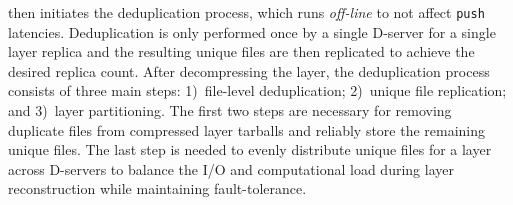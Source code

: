 %
%
%
%
\sysname then initiates the deduplication process, which runs \emph{off-line} to not affect \texttt{push}
latencies. Deduplication is only performed once by a single D-server for a single layer replica
and the resulting unique files are then replicated to achieve the desired replica count.
After decompressing the layer, the deduplication process consists of three main steps: 
1)~file-level deduplication;
2)~unique file replication; and
3)~layer partitioning. 
The first two steps are necessary for removing duplicate files from compressed layer tarballs
and reliably store the remaining unique files.
%
The last step is needed
to evenly distribute unique files for a layer across D-servers to balance the I/O and computational load
during layer reconstruction while maintaining fault-tolerance.  



